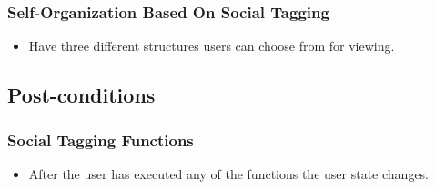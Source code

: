 \documentclass[12pt, oneside]{article}
\begin{document}
\subsubsection{Self-Organization Based On Social Tagging}
\begin{itemize}
\item Have three different structures users can choose from for viewing.
\end{itemize}

\subsection{Post-conditions}
\subsubsection{Social Tagging Functions}    
\begin{itemize}
\item After the user has executed any of the functions the user state changes.

\end{itemize}
\end{document}

